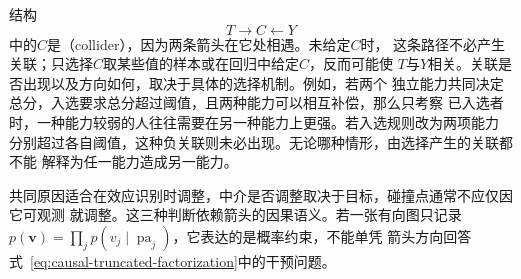 结构
\[
  T\to C\leftarrow Y
\]
中的\(C\)是（collider），因为两条箭头在它处相遇。未给定\(C\)时，
这条路径不必产生关联；只选择\(C\)取某些值的样本或在回归中给定\(C\)，反而可能使
\(T\)与\(Y\)相关。关联是否出现以及方向如何，取决于具体的选择机制。例如，若两个
独立能力共同决定总分，入选要求总分超过阈值，且两种能力可以相互补偿，那么只考察
已入选者时，一种能力较弱的人往往需要在另一种能力上更强。若入选规则改为两项能力
分别超过各自阈值，这种负关联则未必出现。无论哪种情形，由选择产生的关联都不能
解释为任一能力造成另一能力。

共同原因适合在效应识别时调整，中介是否调整取决于目标，碰撞点通常不应仅因它可观测
就调整。这三种判断依赖箭头的因果语义。若一张有向图只记录
\(p(\bm{v})=\prod_jp(v_j\mid\operatorname{pa}_j)\)，它表达的是概率约束，不能单凭
箭头方向回答式~\eqref{eq:causal-truncated-factorization}中的干预问题。

